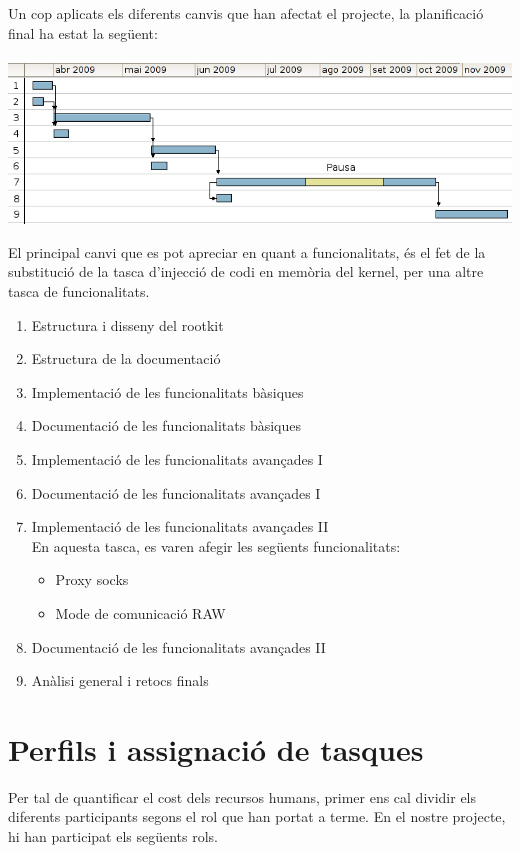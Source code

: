Un cop aplicats els diferents canvis que han afectat el projecte, la planificació final ha estat la següent: \\
\\
\includegraphics[scale=0.68,keepaspectratio]{segon_gantt.png} 

El principal canvi que es pot apreciar en quant a funcionalitats, és el fet de la substitució de la tasca 
d'injecció de codi en memòria del kernel, per una altre tasca de funcionalitats.

\begin{enumerate}
    \item Estructura i disseny del rootkit
    \item Estructura de la documentació
    \item Implementació de les funcionalitats bàsiques
    \item Documentació de les funcionalitats bàsiques
    \item Implementació de les funcionalitats avançades I
    \item Documentació de les funcionalitats avançades I
    \item Implementació de les funcionalitats avançades II\\
		En aquesta tasca, es varen afegir les següents funcionalitats:
		\begin{itemize}
			\item Proxy socks
			\item Mode de comunicació RAW
		\end{itemize}
    \item Documentació de les funcionalitats avançades II
    \item Anàlisi general i retocs finals
\end{enumerate}

\section{Perfils i assignació de tasques}

Per tal de quantificar el cost dels recursos humans, primer ens cal dividir els diferents participants
segons el rol que han portat a terme. En el nostre projecte, hi han participat els següents rols.

